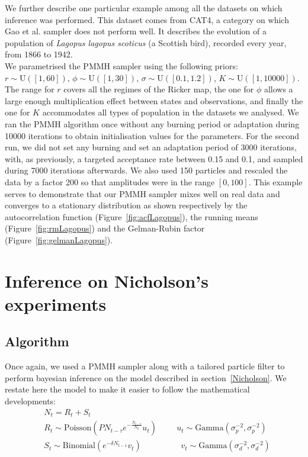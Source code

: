 \documentclass[12pt]{article}
\begin{document}
	We further describe one particular example among all the datasets on which inference was performed. This dataset comes from CAT4, a category on which Gao et al. sampler does not perform well. It describes the evolution of a population of \emph{Lagopus lagopus scoticus} (a Scottish bird), recorded every year, from 1866 to 1942. \\
	We parametrised the PMMH sampler using the following priors: $r \sim \mathrm{U}([1, 60])$, $\phi \sim \mathrm{U}([1, 30])$, $\sigma \sim \mathrm{U}([0.1, 1.2])$, $K \sim \mathrm{U}([1, 10000])$. The range for $r$ covers all the regimes of the Ricker map, the one for $\phi$ allows a large enough multiplication effect between states and observations, and finally the one for $K$ accommodates all types of population in the datasets we analysed. We ran the PMMH algorithm once without any burning period or adaptation during 10000 iterations to obtain initialisation values for the parameters. For the second run, we did not set any burning and set an adaptation period of 3000 iterations, with, as previously, a targeted acceptance rate between 0.15 and 0.1, and sampled during 7000 iterations afterwards. We also used 150 particles and rescaled the data by a factor 200 so that amplitudes were in the range $[0, 100]$. This example serves to demonstrate that our PMMH sampler mixes well on real data and converges to a stationary distribution as shown respectively by the autocorrelation function (Figure~\ref{fig:acfLagopus}), the running means (Figure~\ref{fig:rmLagopus}) and the Gelman-Rubin factor (Figure~\ref{fig:gelmanLagopus}).
	
	\section{Inference on Nicholson's experiments} \label{infNicholson}
	\subsection{Algorithm}
		Once again, we used a PMMH sampler along with a tailored particle filter to perform bayesian inference on the model described in section~\ref{Nicholson}. We restate here the model to make it easier to follow the mathematical developments:
		\begin{align*}
		& N_t = R_t + S_t \\
		& R_t \sim  \mathrm{Poisson}(PN_{t-\tau}e^{-\frac{N_{t-\tau}}{N_0}}u_t)  \hspace{1cm} u_t \sim \mathrm{Gamma}(\sigma_p^{-2}, \sigma_p^{-2})\\ 
		& S_t \sim \mathrm{Binomial}(e^{-\delta N_{t-1}}v_t) \hspace{2cm}  v_t \sim \mathrm{Gamma}(\sigma_d^{-2}, \sigma_d^{-2}) 
		\end{align*}
\end{document}
